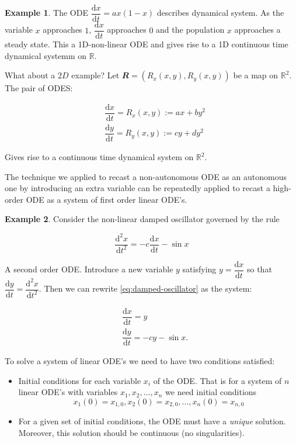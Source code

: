\documentclass[
  a4paper,
  oneside,
  final]{krantz}
\providecommand{\tightlist}{%
  \setlength{\itemsep}{0pt}\setlength{\parskip}{0pt}}
\newcommand{\R}{\mathbb{R}}
\renewcommand{\d}{\mathrm{d}}
\renewcommand{\v}[1]{{\mathbfit{#1}}}
\newcommand{\der}[2]{\dfrac{\d #1}{\d #2}}
\newcommand{\dern}[3]{\dfrac{\d^{#3} #1}{\d #2 ^{#3}}}
\theoremstyle{definition}
\theoremstyle{definition}
\newtheorem{example}{Example}[chapter]
\theoremstyle{definition}
\theoremstyle{definition}
\theoremstyle{remark}
\begin{document}
\begin{example}
The ODE \(\der{x}{t} = a x (1-x)\) describes dynamical system. As the variable \(x\) approaches \(1\), \(\der{x}{t}\) approaches \(0\) and the population \(x\) approaches a steady state. This a 1D-non-linear ODE and gives rise to a 1D continuous time dynamical systemm on \(\R\).

What about a \(2D\) example? Let \(\v{R} = (R_x(x,y), R_{y}(x,y))\) be a map on \(\R^2\). The pair of ODES:

\begin{align*}
 &\der{x}{t} =  R_{x}(x,y) := ax + by^2  \\
 &\der{y}{t} = R_{y}(x,y) := cy + dy^2
\end{align*}

Gives rise to a continuous time dynamical system on \(\R^2\).
\end{example}

The technique we applied to recast a non-autonomous ODE as an autonomous one by introducing an extra variable can be repeatedly applied to recast a high-order ODE as a system of first order linear ODE's.

\begin{example}
Consider the non-linear damped oscillator governed by the rule

\begin{equation} 
\dern{x}{t}{2} = -c \der{x}{t} - \sin x \label{eq:damped-oscillator}
\end{equation}

A second order ODE. Introduce a new variable \(y\) satisfying \(y = \der{x}{t}\) so that \(\der{y}{t} = \dern{x}{t}{2}\).
Then we can rewrite \eqref{eq:damped-oscillator} as the system:

\begin{align*}
 &\der{x}{t} = y \\ 
 &\der{y}{t} = -cy - \sin x.
\end{align*}
\end{example}

To solve a system of linear ODE's we need to have two conditions satisfied:

\begin{itemize}
\tightlist
\item
  Initial conditions for each variable \(x_i\) of the ODE. That is for a system of \(n\) linear ODE's with variables \(x_1, x_2, \ldots, x_{n}\) we need initial conditions
  \[ x_1(0) = x_{1,0}, x_2(0) = x_{2,0}, \ldots, x_n(0) = x_{n,0}\]
\item
  For a given set of initial conditions, the ODE must have a \emph{unique} solution. Moreover, this solution should be continuous (no singularities).
\end{itemize}
\end{document}
